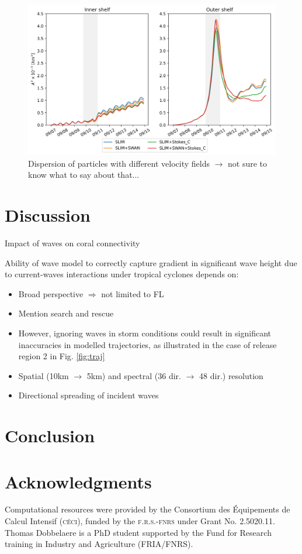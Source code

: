 \documentclass[preprint,12pt,authoryear]{elsarticle}
\begin{document}
\begin{figure}
    \centering
    \includegraphics[width=.98\textwidth]{fig/dispersion.png}
    \caption{Dispersion of particles with different velocity fields $\rightarrow$ not sure to know what to say about that...}
    \label{fig:dispersion}
\end{figure}

\section{Discussion}

Impact of waves on coral connectivity

Ability of wave model to correctly capture gradient in significant wave height due to current-waves interactions under tropical cyclones depends on:
\begin{itemize}
    \item Broad perspective $\Rightarrow$ not limited to FL
    \item Mention search and rescue
    \item However, ignoring waves in storm conditions could result in significant inaccuracies in modelled trajectories, as illustrated in the case of release region 2 in Fig. \ref{fig:traj}
    \item Spatial (10km $\to$ 5km) and spectral (36 dir. $\to$ 48 dir.) resolution \citep{hegermiller2019wave}
    \item Directional spreading of incident waves \citep{villas2020wave}
\end{itemize}

\section{Conclusion}

\section*{Acknowledgments}
Computational resources were provided by the Consortium des \'Equipements de Calcul Intensif (\textsc{c\'eci}), funded by the \textsc{f.r.s.-fnrs} under Grant No. 2.5020.11. Thomas Dobbelaere is a PhD student supported by the Fund for Research training in Industry and Agriculture (\textsc{FRIA}/\textsc{FNRS}).

 

\end{document}

